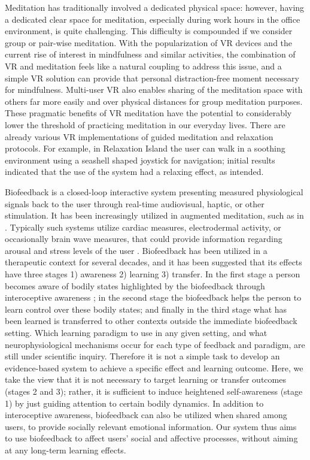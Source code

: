 \documentclass[manuscript, review = false, screen]{acmart}
\begin{document}
Meditation has traditionally involved a dedicated physical space: however, having a dedicated clear space for meditation, especially during work hours in the office environment, is quite challenging. This difficulty is compounded if we consider group or pair-wise meditation. With the popularization of VR devices and the current rise of interest in mindfulness and similar activities, the combination of VR and meditation feels like a natural coupling to address this issue, and a simple VR solution can provide that personal distraction-free moment necessary for mindfulness. Multi-user VR also enables sharing of the meditation space with others far more easily and over physical distances for group meditation purposes. These pragmatic benefits of VR meditation have the potential to considerably lower the threshold of practicing meditation in our everyday lives. There are already various VR implementations of guided meditation and relaxation protocols. For example, in Relaxation Island \cite{Waterworth2004} the user can walk in a soothing environment using a seashell shaped joystick for navigation; initial results indicated that the use of the system had a relaxing effect, as intended. 

Biofeedback is a closed-loop interactive system presenting measured physiological signals back to the user through real-time audiovisual, haptic, or other stimulation. It has been increasingly utilized in augmented meditation, such as in \citet{Chittaro2014, CarissoliClaudia2015}. Typically such systems utilize cardiac measures, electrodermal activity, or occasionally brain wave measures, that could provide information regarding arousal and stress levels of the user \cite{cacioppo2007handbook}. Biofeedback has been utilized in a therapeutic context for several decades, and it has been suggested \cite{calderon2004biofeedback} that its effects have three stages 1) awareness 2) learning 3) transfer. In the first stage a person becomes aware of bodily states highlighted by the biofeedback through interoceptive awareness \cite{Craig2002,dunn2010listening}; in the second stage the biofeedback helps the person to learn control over these bodily states; and finally in the third stage what has been learned is transferred to other contexts outside the immediate biofeedback setting. Which learning paradigm to use in any given setting, and what neurophysiological mechanisms occur for each type of feedback and paradigm, are still under scientific inquiry. Therefore it is not a simple task to develop an evidence-based system to achieve a specific effect and learning outcome. Here, we take the view that it is not necessary to target learning or transfer outcomes (stages 2 and 3); rather, it is sufficient to induce heightened self-awareness (stage 1) by just guiding attention to certain bodily dynamics. In addition to interoceptive awareness, biofeedback can also be utilized when shared among users, to provide socially relevant emotional information. Our system thus aims to use biofeedback to affect users' social and affective processes, without aiming at any long-term learning effects.
\end{document}

